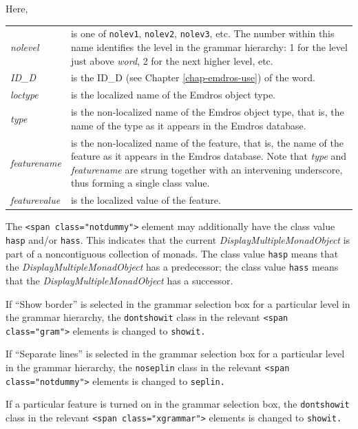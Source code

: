 \documentclass[11pt,oneside,a4paper]{memoir}
\newcommand*{\xml}[1]{\texttt{<#1>}}
\newcommand*{\xmla}[1]{\texttt{#1}} %
\begin{document}
\begin{minipage}{\textwidth}
Here,

\begin{tabu}{>{\itshape}lX}
nolevel & is one of \xmla{nolev1}, \xmla{nolev2}, \xmla{nolev3}, etc. The number within this
          name identifies the level in the grammar hierarchy: 1 for the level just above
          \emph{word}, 2 for the next higher level, etc.\\

ID\_D & is the ID\_D (see Chapter \ref{chap-emdros-use}) of the word.\\

loctype & is the localized name of the Emdros object type.\\

type & is the non-localized name of the Emdros object type, that is, the name of the type as it
appears in the Emdros database.\\

featurename & is the non-localized name of the feature, that is, the name of the feature as it
appears in the Emdros database. Note that \emph{type} and \emph{featurename} are strung together
with an intervening underscore, thus forming a single class value.\\

featurevalue & is the localized value of the feature.\\
\end{tabu}
\end{minipage}

The \xml{span class="notdummy"} element may additionally have the class value \xmla{hasp}
and/or \xmla{hass}. This indicates that the current \emph{DisplayMultipleMonadObject} is part of a
noncontiguous collection of monads. The class value \xmla{hasp} means that the
\emph{DisplayMultipleMonadObject} has a predecessor; the class value \xmla{hass} means that the
\emph{DisplayMultipleMonadObject} has a successor.


If ``Show border'' is selected in the grammar selection box for a particular level in the grammar
hierarchy, the \xmla{dontshowit} class in the relevant \xml{span class="gram"} elements is changed
to \xmla{showit.}

If ``Separate lines'' is selected in the grammar selection box for a particular level in the grammar
hierarchy, the \xmla{noseplin} class in the relevant \xml{span class="notdummy"} elements is changed
to \xmla{seplin.}

If a particular feature is turned on in the grammar selection box, the \xmla{dontshowit} class in the
relevant \xml{span class="xgrammar"} elements is changed to \xmla{showit.}
\end{document}

